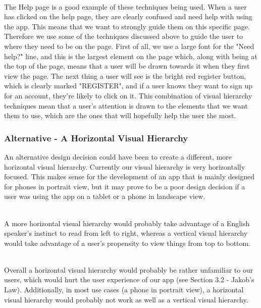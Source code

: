 \documentclass[a4paper, 11pt]{article}
\begin{document}
~\\
The Help page is a good example of these techniques being used. When a user has clicked on the help page, they are clearly confused and need help with using the app. This means that we want to strongly guide them on this specific page. Therefore we use some of the techniques discussed above to guide the user to where they need to be on the page. First of all, we use a large font for the "Need help?" line, and this is the largest element on the page which, along with being at the top of the page, means that a user will be drawn towards it when they first view the page. The next thing a user will see is the bright red register button, which is clearly marked "REGISTER", and if a user knows they want to sign up for an account, they're likely to click on it. This combination of visual hierarchy techniques mean that a user's attention is drawn to the elements that we want them to use, which are the ones that will hopefully help the user the most.

\subsubsection{Alternative - A Horizontal Visual Hierarchy}
An alternative design decision could have been to create a different, more horizontal visual hierarchy. Currently our visual hierarchy is very horizontally focused. This makes sense for the development of an app that is mainly designed for phones in portrait view, but it may prove to be a poor design decision if a user was using the app on a tablet or a phone in landscape view. 

~\\
A more horizontal visual hierarchy would probably take advantage of a English speaker's instinct to read from left to right, whereas a vertical visual hierarchy would take advantage of a user's propensity to view things from top to bottom.

~\\
Overall a horizontal visual hierarchy would probably be rather unfamiliar to our users, which would hurt the user experience of our app (see Section 3.2 - Jakob's Law). Additionally, in most use cases (a phone in portrait view), a horizontal visual hierarchy would probably not work as well as a vertical visual hierarchy.
\end{document}
